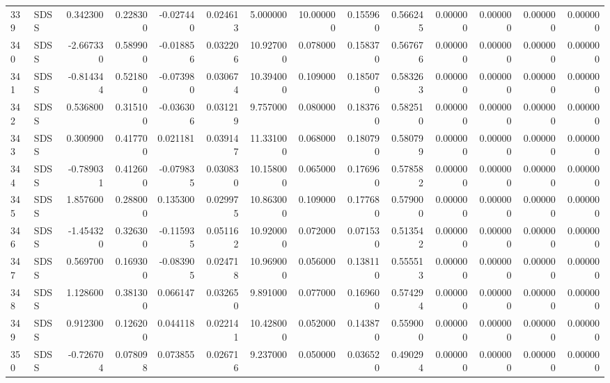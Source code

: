 \begin{tabular}{llrrrrrrrrrrrr}
339 &   SDSS &  0.342300 &      0.228300 & -0.027440 &    0.024613 &   5.000000 &     10.000000 &   0.155960 &  0.566245 &  0.000000 &   0.000000 &     0.000000 &     0.000000 \\
340 &   SDSS & -2.667330 &      0.589900 & -0.018856 &    0.032206 &  10.927000 &      0.078000 &   0.158370 &  0.567676 &  0.000000 &   0.000000 &     0.000000 &     0.000000 \\
341 &   SDSS & -0.814344 &      0.521800 & -0.073980 &    0.030674 &  10.394000 &      0.109000 &   0.185070 &  0.583263 &  0.000000 &   0.000000 &     0.000000 &     0.000000 \\
342 &   SDSS &  0.536800 &      0.315100 & -0.036306 &    0.031219 &   9.757000 &      0.080000 &   0.183760 &  0.582510 &  0.000000 &   0.000000 &     0.000000 &     0.000000 \\
343 &   SDSS &  0.300900 &      0.417700 &  0.021181 &    0.039147 &  11.331000 &      0.068000 &   0.180790 &  0.580799 &  0.000000 &   0.000000 &     0.000000 &     0.000000 \\
344 &   SDSS & -0.789031 &      0.412600 & -0.079835 &    0.030830 &  10.158000 &      0.065000 &   0.176960 &  0.578582 &  0.000000 &   0.000000 &     0.000000 &     0.000000 \\
345 &   SDSS &  1.857600 &      0.288000 &  0.135300 &    0.029975 &  10.863000 &      0.109000 &   0.177680 &  0.579000 &  0.000000 &   0.000000 &     0.000000 &     0.000000 \\
346 &   SDSS & -1.454320 &      0.326300 & -0.115935 &    0.051162 &  10.920000 &      0.072000 &   0.071530 &  0.513542 &  0.000000 &   0.000000 &     0.000000 &     0.000000 \\
347 &   SDSS &  0.569700 &      0.169300 & -0.083905 &    0.024718 &  10.969000 &      0.056000 &   0.138110 &  0.555513 &  0.000000 &   0.000000 &     0.000000 &     0.000000 \\
348 &   SDSS &  1.128600 &      0.381300 &  0.066147 &    0.032650 &   9.891000 &      0.077000 &   0.169600 &  0.574294 &  0.000000 &   0.000000 &     0.000000 &     0.000000 \\
349 &   SDSS &  0.912300 &      0.126200 &  0.044118 &    0.022141 &  10.428000 &      0.052000 &   0.143870 &  0.559000 &  0.000000 &   0.000000 &     0.000000 &     0.000000 \\
350 &   SDSS & -0.726704 &      0.078098 &  0.073855 &    0.026716 &   9.237000 &      0.050000 &   0.036520 &  0.490294 &  0.000000 &   0.000000 &     0.000000 &     0.000000 \\

\end{tabular}

